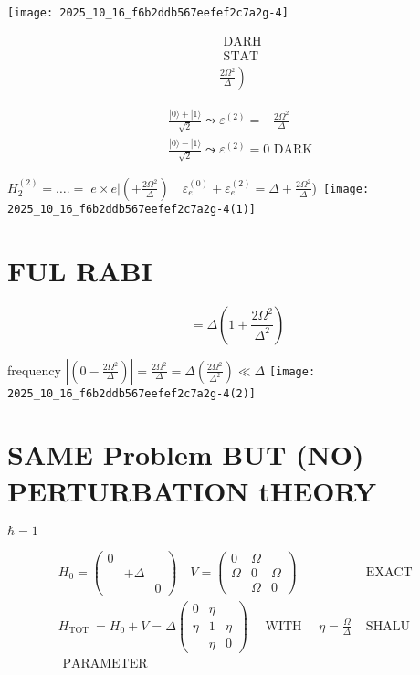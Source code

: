 \begin{center}
\texttt{[image: 2025\_10\_16\_f6b2ddb567eefef2c7a2g-4]}
\end{center}

$$
\begin{aligned}
& \text { DARH } \\
& \text { STAT } \\
& \left.\frac{2 \Omega^{2}}{\Delta}\right)
\end{aligned}
$$

$$
\begin{aligned}
& \frac{|0\rangle+|1\rangle}{\sqrt{2}} \leadsto \varepsilon^{(2)}=-\frac{2 \Omega^{2}}{\Delta} \\
& \frac{|0\rangle-|1\rangle}{\sqrt{2}} \leadsto \varepsilon^{(2)}=0 \text { DARK }
\end{aligned}
$$

$H_{2}^{(2)}=\ldots .=|e \times e|\left(+\frac{2 \Omega^{2}}{\Delta}\right) \quad \varepsilon_{e}^{(0)}+\varepsilon_{e}^{(2)}=\Delta+\frac{2 \Omega^{2}}{\Delta}$)\
\texttt{[image: 2025\_10\_16\_f6b2ddb567eefef2c7a2g-4(1)]}

\section*{FUL RABI}
$$
=\Delta\left(1+\frac{2 \Omega^{2}}{\Delta^{2}}\right)
$$

frequency $\left|\left(0-\frac{2 \Omega^{2}}{\Delta}\right)\right|=\frac{2 \Omega^{2}}{\Delta}=\Delta\left(\frac{2 \Omega^{2}}{\Delta^{2}}\right) \ll \Delta$
\texttt{[image: 2025\_10\_16\_f6b2ddb567eefef2c7a2g-4(2)]}

\section*{SAME Problem BUT (NO) PERTURBATION tHEORY}
$\hbar=1$

$$
\begin{array}{ll}
H_{0}=\left(\begin{array}{ccc}
0 & & \\ & +\Delta & \\ & & 0
\end{array}\right) \quad V=\left(\begin{array}{ccc}
0 & \Omega & \\ \Omega & 0 & \Omega \\ & \Omega & 0
\end{array}\right) & \text { EXACT } \\ H_{\text {TOT }}=H_{0}+V=\Delta\left(\begin{array}{ccc}
0 & \eta & \\ \eta & 1 & \eta \\ & \eta & 0
\end{array}\right) \quad \text { WITH } \quad \eta=\frac{\Omega}{\Delta} & \text { SHALU } \\ \text { PARAMETER } 
\end{array}
$$

